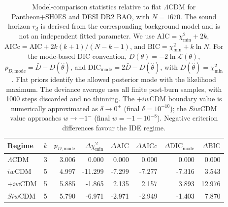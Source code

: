 \begin{table}[htbp]
\centering
\small
\begin{tabular}{lrrrrrrr}
\toprule
Regime & $k$ & $p_{D,\mathrm{mode}}$ & $\Delta\chi^2_{\min}$ & $\Delta\mathrm{AIC}$ & $\Delta\mathrm{AICc}$ & $\Delta\mathrm{DIC}_{\mathrm{mode}}$ & $\Delta\mathrm{BIC}$ \\
\midrule
$\Lambda$CDM & 3 & 3.006 & 0.000 & 0.000 & 0.000 & 0.000 & 0.000 \\
$iw$CDM & 5 & 4.997 & -11.299 & -7.299 & -7.277 & -7.316 & 3.543 \\
$+iw$CDM & 5 & 5.885 & -1.865 & 2.135 & 2.157 & 3.893 & 12.976 \\
$Siw$CDM & 5 & 5.790 & -6.971 & -2.971 & -2.949 & -1.403 & 7.870 \\
\bottomrule
\end{tabular}
\caption{Model-comparison statistics relative to flat $\Lambda$CDM for Pantheon+SH0ES and DESI DR2 BAO, with $N=1670$. The sound horizon $r_d$ is derived from the corresponding background model and is not an independent fitted parameter. We use $\mathrm{AIC}=\chi^2_{\min}+2k$, $\mathrm{AICc}=\mathrm{AIC}+2k(k+1)/(N-k-1)$, and $\mathrm{BIC}=\chi^2_{\min}+k\ln N$. For the mode-based DIC convention, $D(\theta)=-2\ln\mathcal{L}(\theta)$, $p_{D,\mathrm{mode}}=\bar D-D(\hat\theta)$, and $\mathrm{DIC}_{\mathrm{mode}}=2\bar D-D(\hat\theta)$, with $D(\hat\theta)=\chi^2_{\min}$. Flat priors identify the allowed posterior mode with the likelihood maximum. The deviance average uses all finite post-burn samples, with 1000 steps discarded and no thinning. The $+iw$CDM boundary value is numerically approximated as $\delta\to0^+$ (final $\delta=10^{-10}$); the $Siw$CDM value approaches $w\to-1^-$ (final $w=-1-10^{-8}$). Negative criterion differences favour the IDE regime.}
\label{tab:model_comparison_mode_dic}
\end{table}
